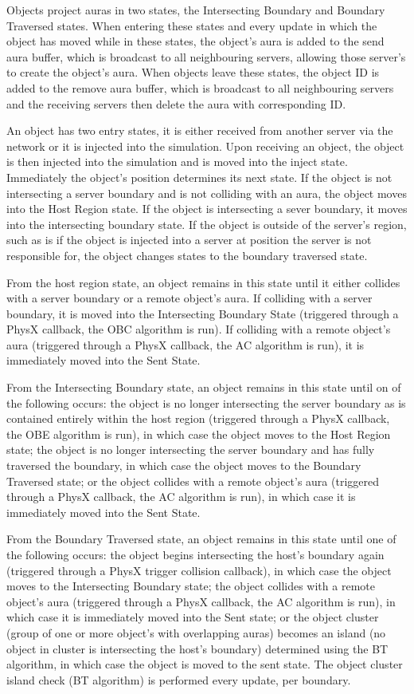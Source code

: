 Objects project auras in two states, the Intersecting Boundary and Boundary Traversed states. When entering these states and every update in which the object has moved while in these states, the object's aura is added to the send aura buffer, which is broadcast to all neighbouring servers, allowing those server's to create the object's aura. When objects leave these states, the object ID is added to the remove aura buffer, which is broadcast to all neighbouring servers and the receiving servers then delete the aura with corresponding ID.

An object has two entry states, it is either received from another server via the network or it is injected into the simulation. Upon receiving an object, the object is then injected into the simulation and is moved into the inject state. Immediately the object's position determines its next state. If the object is not intersecting a server boundary and is not colliding with an aura, the object moves into the Host Region state. If the object is intersecting a sever boundary, it moves into the intersecting boundary state. If the object is outside of the server's region, such as is if the object is injected into a server at position the server is not responsible for, the object changes states to the boundary traversed state.

From the host region state, an object remains in this state until it either collides with a server boundary or a remote object's aura. If colliding with a server boundary, it is moved into the Intersecting Boundary State (triggered through a PhysX callback, the OBC algorithm is run). If colliding with a remote object's aura (triggered through a PhysX callback, the AC algorithm is run), it is immediately moved into the Sent State.

From the Intersecting Boundary state, an object remains in this state until on of the following occurs: the object is no longer intersecting the server boundary as is contained entirely within the host region (triggered through a PhysX callback, the OBE algorithm is run), in which case the object moves to the Host Region state; the object is no longer intersecting the server boundary and has fully traversed the boundary, in which case the object moves to the Boundary Traversed state; or the object collides with a remote object's aura (triggered through a PhysX callback, the AC algorithm is run), in which case it is immediately moved into the Sent State.

From the Boundary Traversed state, an object remains in this state until one of the following occurs: the object begins intersecting the host's boundary again (triggered through a PhysX trigger collision callback), in which case the object moves to the Intersecting Boundary state; the object collides with a remote object's aura (triggered through a PhysX callback, the AC algorithm is run), in which case it is immediately moved into the Sent state; or the object cluster (group of one or more object's with overlapping auras) becomes an island (no object in cluster is intersecting the host's boundary) determined using the BT algorithm, in which case the object is moved to the sent state. The object cluster island check (BT algorithm) is performed every update, per boundary.

